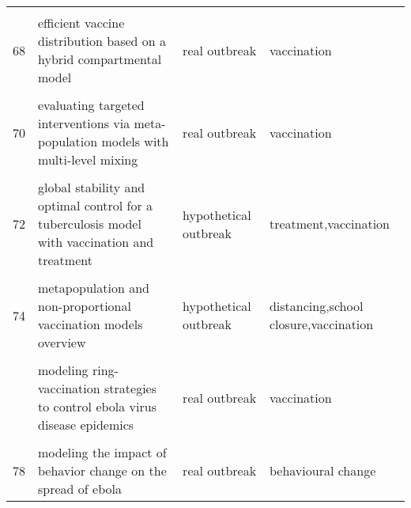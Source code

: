 \documentclass[
]{article}
\begin{document}
\begin{landscape}
\begin{longtable}{l>{\raggedright\arraybackslash}p{3cm}l>{\raggedright\arraybackslash}p{8cm}}
\cellcolor{gray!6}{67} & \cellcolor{gray!6}{economic evaluation of individual school closure strategies: the hong kong 2009 h1n1 pandemic} & \cellcolor{gray!6}{real outbreak} & \cellcolor{gray!6}{school closure}\\
68 & efficient vaccine distribution based on a hybrid compartmental model & real outbreak & vaccination\\
\cellcolor{gray!6}{69} & \cellcolor{gray!6}{epidemiological evaluation of different fmd control strategies in two selected regions in austria} & \cellcolor{gray!6}{hypothetical outbreak} & \cellcolor{gray!6}{culling,vaccination,ring culling,and combinations of above}\\
70 & evaluating targeted interventions via meta-population models with multi-level mixing & real outbreak & vaccination\\
\addlinespace
\cellcolor{gray!6}{71} & \cellcolor{gray!6}{evaluation of outbreak response immunization in the control of pertussis using agent-based modeling} & \cellcolor{gray!6}{real outbreak} & \cellcolor{gray!6}{vaccination}\\
72 & global stability and optimal control for a tuberculosis model with vaccination and treatment & hypothetical outbreak & treatment,vaccination\\
\cellcolor{gray!6}{73} & \cellcolor{gray!6}{impact on epidemic measles of vaccination campaigns triggered by disease outbreaks or serosurveys: a modeling study} & \cellcolor{gray!6}{hypothetical outbreak} & \cellcolor{gray!6}{vaccination}\\
74 & metapopulation and non-proportional vaccination models overview & hypothetical outbreak & distancing,school closure,vaccination\\
\cellcolor{gray!6}{75} & \cellcolor{gray!6}{model-based comprehensive analysis of school closure policies for mitigating influenza epidemics and pandemics} & \cellcolor{gray!6}{real outbreak} & \cellcolor{gray!6}{school closure}\\
\addlinespace
76 & modeling ring-vaccination strategies to control ebola virus disease epidemics & real outbreak & vaccination\\
\cellcolor{gray!6}{77} & \cellcolor{gray!6}{modeling the effect of public health resources and alerting on the dynamics of pertussis spread*} & \cellcolor{gray!6}{hypothetical outbreak} & \cellcolor{gray!6}{contact tracing,vaccination}\\
78 & modeling the impact of behavior change on the spread of ebola & real outbreak & behavioural change\\

\end{longtable}
\end{landscape}
\end{document}
